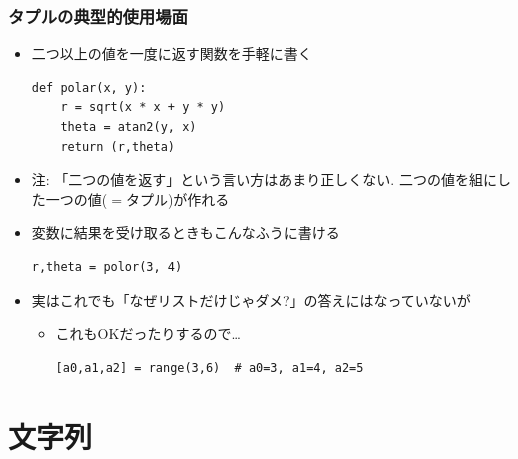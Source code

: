 \documentclass[10pt,dvipdfmx]{beamer}
\newcommand{\ao}[1]{{\color{blue}#1}}
\begin{document}
\begin{frame}[fragile]
\frametitle{タプルの典型的使用場面}
\begin{itemize}
\item 二つ以上の値を一度に返す関数を手軽に書く
\begin{lstlisting}
def polar(x, y):
    r = sqrt(x * x + y * y)
    theta = atan2(y, x)
    return (r,theta)
\end{lstlisting}
\item 注: {\small 
「二つの値を返す」という言い方はあまり正しくない.
\ao{二つの値を組にした一つの値($=$タプル)}が作れる}

\item 変数に結果を受け取るときもこんなふうに書ける
\begin{lstlisting}
r,theta = polor(3, 4)
\end{lstlisting}

\item 実はこれでも「なぜリストだけじゃダメ?」の答えにはなっていないが
  \begin{itemize}
  \item これもOKだったりするので\ldots
\begin{lstlisting}
[a0,a1,a2] = range(3,6)  # a0=3, a1=4, a2=5
\end{lstlisting}
\end{itemize}

\end{itemize}
\end{frame}


\section{文字列}
\end{document}
